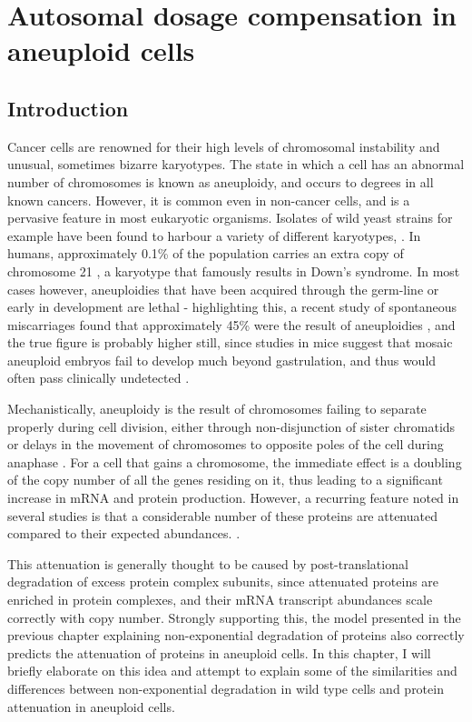 \documentclass[a4paper,11pt,twoside,openright]{scrbook}
\begin{document}
\chapter{Autosomal dosage compensation in aneuploid cells}\label{chapter:aneuploidy}

\section{Introduction}

Cancer cells are renowned for their high levels of chromosomal instability and
unusual, sometimes bizarre karyotypes. The state in which a cell has an abnormal
number of chromosomes is known as aneuploidy, and occurs to degrees in all known
cancers. However, it is common even in non-cancer cells, and is a pervasive
feature in most eukaryotic organisms. Isolates of wild yeast strains for example
have been found to harbour a variety of different karyotypes, \cite{Hose2015}.
In humans, approximately 0.1\% of the population carries an extra copy of
chromosome 21 \cite{Presson2013}, a karyotype that famously results in Down's
syndrome. In most cases however, aneuploidies that have been acquired through
the germ-line or early in development are lethal - highlighting this, a recent
study of spontaneous miscarriages found that approximately 45\% were the result
of aneuploidies \cite{Jia2015}, and the true figure is probably higher still,
since studies in mice suggest that mosaic aneuploid embryos fail to develop much
beyond gastrulation, and thus would often pass clinically undetected
\cite{Lightfoot2006}.

Mechanistically, aneuploidy is the result of chromosomes failing to separate
properly during cell division, either through non-disjunction of sister
chromatids or delays in the movement of chromosomes to opposite poles of the
cell during anaphase \cite{Compton2011}. For a cell that gains a chromosome, the
immediate effect is a doubling of the copy number of all the genes residing on
it, thus leading to a significant increase in mRNA and protein production.
However, a recurring feature noted in several studies is that a considerable
number of these proteins are attenuated compared to their expected abundances.
\cite{Stingele2012,Dephoure2014,Goncalves2017}.

This attenuation is generally thought to be caused by post-translational
degradation of excess protein complex subunits, since attenuated proteins are
enriched in protein complexes, and their mRNA transcript abundances scale
correctly with copy number. Strongly supporting this, the model presented in the
previous chapter explaining non-exponential degradation of proteins also
correctly predicts the attenuation of proteins in aneuploid cells. In this
chapter, I will briefly elaborate on this idea and attempt to explain some of
the similarities and differences between non-exponential degradation in wild
type cells and protein attenuation in aneuploid cells.
\end{document}

